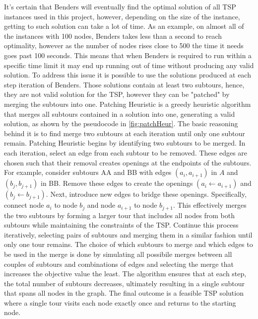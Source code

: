 It's certain that Benders will eventually find the optimal solution of all TSP instances used in this project, however, depending on the size of the instance, getting to such solution can take a lot of time.
As an example, on almost all of the instances with 100 nodes, Benders takes less than a second to reach optimality, however as the number of nodes rises close to 500 the time it needs goes past 100 seconds.
This means that when Benders is required to run within a specific time limit it may end up running out of time without producing any valid solution.
To address this issue it is possible to use the solutions produced at each step iteration of Benders.
Those solutions contain at least two subtours, hence, they are not valid solution for the TSP, however they can be "patched" by merging the subtours into one.
Patching Heuristic is a greedy heuristic algorithm that merges all subtours contained in a solution into one, generating a valid solution, as shown by the pseudocode in \figurename{ \ref{fig:patchHeur}}.
The basic reasoning behind it is to find merge two subtours at each iteration until only one subtour remain.
Patching Heuristic begins by identifying two subtours to be merged.
In each iteration, select an edge from each subtour to be removed.
These edges are chosen such that their removal creates openings at the endpoints of the subtours.
For example, consider subtours AA and BB with edges $(a_i,a_{i+1})$ in $A$ and $(b_j,b_{j+1})$ in BB.
Remove these edges to create the openings $(a_i \leftarrow a_{i+1})$ and $(b_j \leftarrow b_{j+1})$.
Next, introduce new edges to bridge these openings. Specifically, connect node $a_i$ to node $b_j$ and node $a_{i+1}$ to node $b_{j+1}$.
This effectively merges the two subtours by forming a larger tour that includes all nodes from both subtours while maintaining the constraints of the TSP.
Continue this process iteratively, selecting pairs of subtours and merging them in a similar fashion until only one tour remains.
The choice of which subtours to merge and which edges to be used in the merge is done by simulating all possibile merges between all couples of subtours and combinations of edges and selecting the merge that increases the objective value the least.
The algorithm ensures that at each step, the total number of subtours decreases, ultimately resulting in a single subtour that spans all nodes in the graph.
The final outcome is a feasible TSP solution where a single tour visits each node exactly once and returns to the starting node.

